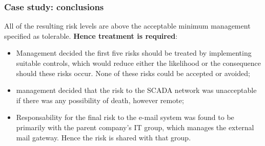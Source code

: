 \documentclass[xcolor ={table,usenames,dvipsnames}]{beamer}
\theoremstyle{definition}
\begin{document}
	\begin{frame}
		\frametitle{Case study: conclusions}
		All of the resulting risk levels are above the acceptable minimum management specified as tolerable. \textbf{Hence treatment is required}:
		\begin{itemize}
			\item Management decided the first five risks should be treated
			by implementing suitable controls, which would reduce either the likelihood or the consequence should these risks occur. None of these risks could be accepted or avoided;
			\item management decided that the risk to the SCADA network was
			unacceptable if there was any possibility of death, however remote;
			\item Responsability for the final risk	to the e-mail system was found to be primarily with the parent company’s IT group, which manages the external mail gateway. Hence the risk is shared with that group.
		\end{itemize}
	\end{frame}



	

	

	





	

	
\end{document}
